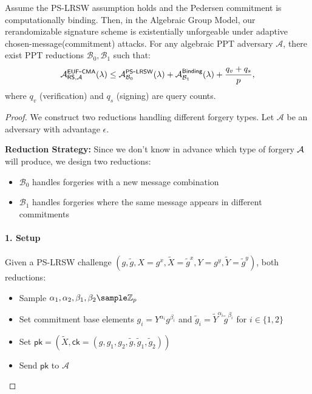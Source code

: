 \begin{theorem}
Assume the PS-LRSW assumption holds and the Pedersen commitment is computationally binding. Then, in the Algebraic Group Model, our rerandomizable signature scheme is existentially unforgeable under adaptive chosen-message(commitment) attacks. For any algebraic PPT adversary $\mathcal{A}$, there exist PPT reductions $\mathcal{B}_0, \mathcal{B}_1$ such that:
\[
\mathcal{A}^{\mathsf{EUF\mbox{-}CMA}}_{\mathsf{RS},\mathcal{A}}(\lambda) \leq \mathcal{A}^{\mathsf{PS\mbox{-}LRSW}}_{\mathcal{B}_0}(\lambda) + \mathcal{A}^{\mathsf{Binding}}_{\mathcal{B}_1}(\lambda) + \frac{q_v + q_s}{p},
\]
where $q_v$ (verification) and $q_s$ (signing) are query counts.
\end{theorem}

\begin{proof}
We construct two reductions handling different forgery types. Let $\mathcal{A}$ be an adversary with advantage $\epsilon$.

\textbf{Reduction Strategy: } Since we don't know in advance which type of forgery $\mathcal{A}$ will produce, we design two reductions:
\begin{itemize}
    \item $\mathcal{B}_0$ handles forgeries with a new message combination
    \item $\mathcal{B}_1$ handles forgeries where the same message appears in different commitments
\end{itemize}

\paragraph{1. Setup}
Given a PS-LRSW challenge $(g, \tilde{g}, X=g^x, \tilde{X}=\tilde{g}^x, Y=g^y, \tilde{Y}=\tilde{g}^y)$, both reductions:
\begin{itemize}
    \item Sample $\alpha_1, \alpha_2, \beta_1, \beta_2 \sample \Z_p$ 
    \item Set commitment base elements $g_i = Y^{\alpha_i}g^{\beta_i}$ and $\tilde{g}_i = \tilde{Y}^{\alpha_i}\tilde{g}^{\beta_i}$ for $i \in \{1,2\}$
    \item Set $\mathsf{pk} = (\tilde{X}, \mathsf{ck} = (g, g_1, g_2, \tilde{g}, \tilde{g}_1, \tilde{g}_2))$
    \item Send $\mathsf{pk}$ to $\mathcal{A}$
\end{itemize}


\end{proof}
